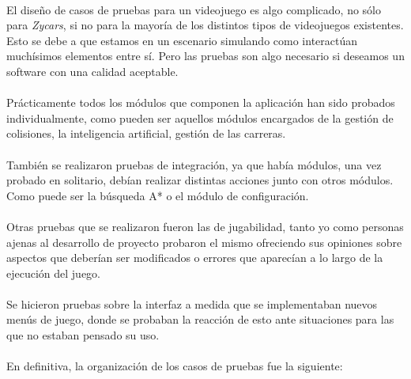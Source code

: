 
\paragraph{}
El diseño de casos de pruebas para un videojuego es algo complicado, no sólo para \emph{Zycars}, si no para la mayoría de los
distintos tipos de videojuegos existentes. Esto se debe a que estamos en un
escenario simulando como interactúan muchísimos 
elementos entre sí. Pero las pruebas son algo necesario si deseamos un software con una calidad aceptable.

\paragraph{}
Prácticamente todos los módulos que componen la aplicación han sido probados individualmente, como pueden ser aquellos módulos 
encargados de la gestión de colisiones, la inteligencia artificial, gestión de las carreras.

\paragraph{}
También se realizaron pruebas de integración, ya que había módulos, una vez probado en solitario, debían realizar distintas acciones 
junto con otros módulos. Como puede ser la búsqueda A* o el módulo de configuración.

\paragraph{}
Otras pruebas que se realizaron fueron las de jugabilidad, tanto yo como
personas ajenas al desarrollo de proyecto probaron el 
mismo ofreciendo sus opiniones sobre aspectos que deberían ser modificados o
errores que aparecían a lo largo de la ejecución
del juego.

\paragraph{}
Se hicieron pruebas sobre la interfaz a medida que se implementaban nuevos menús de juego, donde se probaban
la reacción de esto ante situaciones para las que no estaban pensado su uso.

\paragraph{}
En definitiva, la organización de los casos de pruebas fue la siguiente:

